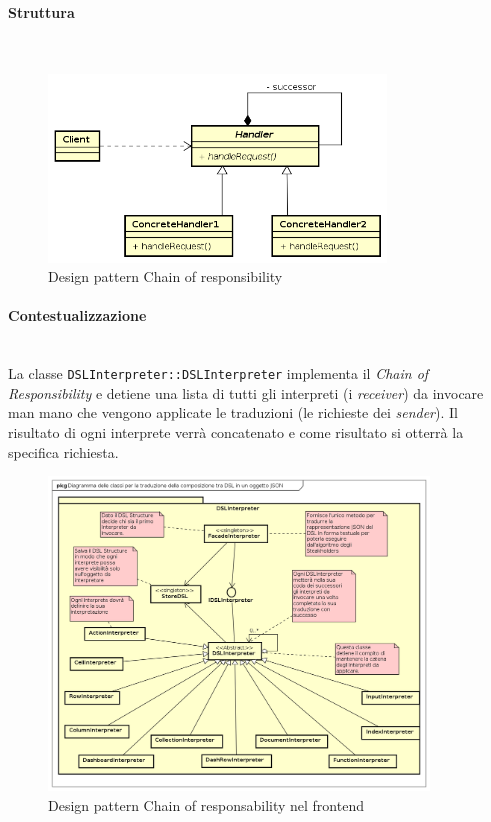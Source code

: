 \paragraph{Struttura} \mbox{} \\
\begin{figure}[H]
\centering
\includegraphics[width=0.8\textwidth]{res/sections/backend/chainOfResponsability.png}
\caption{Design pattern Chain of responsibility}
\end{figure}
\paragraph{Contestualizzazione}\mbox{} \\
La classe \texttt{DSLInterpreter::DSLInterpreter} implementa il \textit{Chain of Responsibility} e detiene una lista di tutti gli interpreti (i \textit{receiver}) da invocare man mano che vengono applicate le traduzioni (le richieste dei \textit{sender}). Il risultato di ogni interprete verrà concatenato e come risultato si otterrà la specifica  richiesta.
\begin{figure}[H]
\centering
\includegraphics[width=0.9\textwidth]{res/sections/frontend/chainOfResponsability.png}
\caption{Design pattern Chain of responsability nel frontend}
\end{figure}
